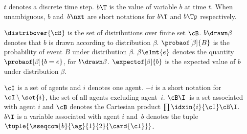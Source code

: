 \(t\) denotes a discrete time step.
\(b\T\) is the value of variable \(b\) at time \(t\).
When unambiguous, \(b\) and~\(b\nxt\) are short notations for \(b\T\) and \(b\Tp\) respectively.

\(\distribover{\cB}\) is the set of distributions over finite set \(\cB\).
\(b \drawn \beta\) denotes that \(b\) is drawn according to distribution \(\beta\).
\(\probaof[\beta]{B}\) is the probability of event \(B\) under distribution \(\beta\).
\(\beta \elmt{e}\) denotes the quantity \(\probaof[\beta]{b = e}\), for \(b \drawn \beta\).
\(\expectof[\beta]{b}\) is the expected value of \(b\) under distribution \(\beta\).

\(\cI\) is a set of agents and \(i\) denotes one agent.
\(-i\) is a short notation for \(\cI \setminus \set{i}\), the set of all agents excluding agent~\(i\).
\(\cB\I\)~is a set associated with agent \(i\) and \(\cB\) denotes the Cartesian product \(\prod\idxin{i}{\cI} \cB\I\).
\(b\I\) is a variable associated with agent \(i\) and~\(b\) denotes the tuple \(\tuple{\sseqcom{b}{\ag}{1}{2}{\card{\cI}}}\).
